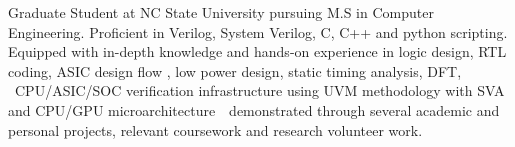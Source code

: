

\begin{cvparagraph}

Graduate Student at NC State University pursuing M.S in Computer Engineering. Proficient in Verilog, System Verilog, C, C++ and python scripting. Equipped with in-depth knowledge and hands-on experience in logic design, RTL coding, ASIC design flow , low power design, static timing analysis, DFT, \ CPU/ASIC/SOC verification infrastructure using UVM methodology with SVA and CPU/GPU microarchitecture\ \ demonstrated through several academic and personal projects, relevant coursework and research volunteer work.

\end{cvparagraph}

